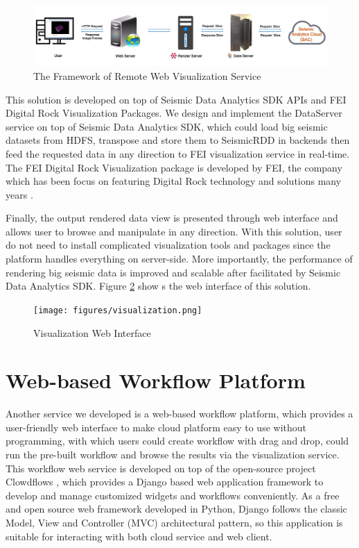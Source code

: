 \begin{figure}[h]
\centering
\includegraphics[scale=0.3]{figures/visualization_framework.png}
\caption{The Framework of Remote Web Visualization Service}
\label{visualization_framework}
\end{figure}

This solution is developed on top of Seismic Data Analytics SDK APIs and FEI Digital Rock Visualization Packages. We design and implement the DataServer service on top of Seismic Data Analytics SDK, which could load big seismic datasets from HDFS, transpose and store them to SeismicRDD in backends then feed the requested data in any direction to FEI visualization service in real-time. The FEI Digital Rock Visualization package is developed by FEI, the company which has been focus on featuring Digital Rock technology and solutions many years \cite{FEICompany}. 

Finally, the output rendered data view is presented through web interface and allows user to browse and manipulate in any direction. With this solution, user do not need to install complicated visualization tools and packages since the platform handles everything on server-side. More importantly, the performance of rendering big seismic data is improved and scalable after facilitated by Seismic Data Analytics SDK. Figure \ref{visualization} show s the web interface of this solution.

\begin{figure}[h]
\centering
\texttt{[image: figures/visualization.png]}
\caption{Visualization Web Interface}
\label{visualization}
\end{figure}


\section{Web-based Workflow Platform}

Another service we developed is a web-based workflow platform, which provides a user-friendly web interface to make cloud platform easy to use without programming, with which users could create workflow with drag and drop, could run the pre-built workflow and browse the results via the visualization service. This workflow web service is developed on top of the open-source project Clowdflows \cite{Clowdflows}, which provides a Django based web application framework to develop and manage customized widgets and workflows conveniently. As a free and open source web framework developed in Python, Django follows the classic Model, View and Controller (MVC) architectural pattern, so this application is suitable for interacting with both cloud service and web client.

